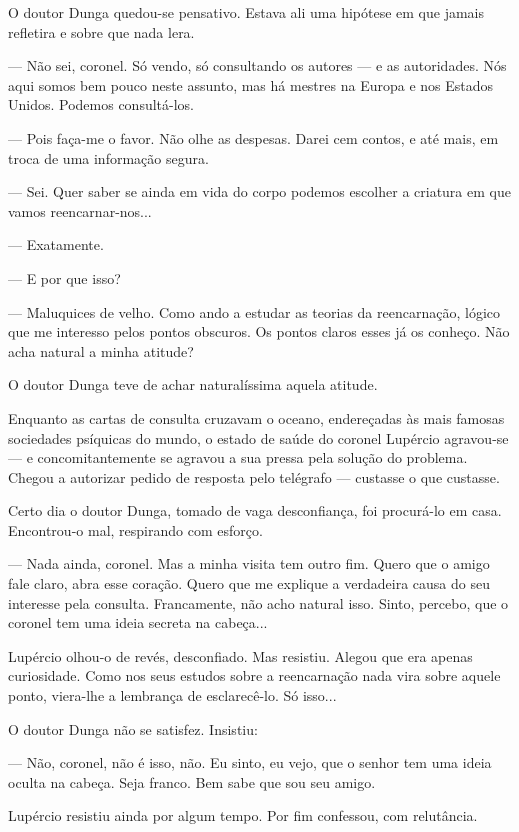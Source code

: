 O doutor Dunga quedou-se pensativo. Estava ali uma hipótese em que
jamais refletira e sobre que nada lera.

--- Não sei, coronel. Só vendo, só consultando os autores --- e as
autoridades. Nós aqui somos bem pouco neste assunto, mas há mestres na
Europa e nos Estados Unidos. Podemos consultá-los.

--- Pois faça-me o favor. Não olhe as despesas. Darei cem contos, e até
mais, em troca de uma informação segura.

--- Sei. Quer saber se ainda em vida do corpo podemos escolher a
criatura em que vamos reencarnar-nos...

--- Exatamente.

--- E por que isso?

--- Maluquices de velho. Como ando a estudar as teorias da reencarnação,
lógico que me interesso pelos pontos obscuros. Os pontos claros esses já
os conheço. Não acha natural a minha atitude?

O doutor Dunga teve de achar naturalíssima aquela atitude.

Enquanto as cartas de consulta cruzavam o oceano, endereçadas às mais
famosas sociedades psíquicas do mundo, o estado de saúde do coronel
Lupércio agravou-se --- e concomitantemente se agravou a sua pressa pela
solução do problema. Chegou a autorizar pedido de resposta pelo
telégrafo --- custasse o que custasse.

Certo dia o doutor Dunga, tomado de vaga desconfiança, foi procurá-lo em
casa. Encontrou-o mal, respirando com esforço.

--- Nada ainda, coronel. Mas a minha visita tem outro fim. Quero que o
amigo fale claro, abra esse coração. Quero que me explique a verdadeira
causa do seu interesse pela consulta. Francamente, não acho natural
isso. Sinto, percebo, que o coronel tem uma ideia secreta na cabeça...

Lupércio olhou-o de revés, desconfiado. Mas resistiu. Alegou que era
apenas curiosidade. Como nos seus estudos sobre a reencarnação nada vira
sobre aquele ponto, viera-lhe a lembrança de esclarecê-lo. Só isso...

O doutor Dunga não se satisfez. Insistiu:

--- Não, coronel, não é isso, não. Eu sinto, eu vejo, que o senhor tem
uma ideia oculta na cabeça. Seja franco. Bem sabe que sou seu amigo.

Lupércio resistiu ainda por algum tempo. Por fim confessou, com
relutância.

